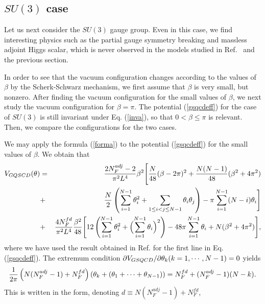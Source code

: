 \documentclass[a4paper,12pt]{article}
\begin{document}
\subsection{$SU(3)$ case}
Let us next consider the $SU(3)$ gauge group. 
Even in this case, we find interesting physics such
as the partial gauge symmetry breaking and massless adjoint 
Higgs scalar, which is never observed in the models 
studied in Ref.~\cite{takenagab} and the previous section. 
\par
In order to see that the vacuum configuration changes
according to the values of $\beta$ by the Scherk-Schwarz 
mechanism, we first assume that $\beta$ is
very small, but nonzero. After finding the vacuum configuration 
for the small values of $\beta$, we next study the vacuum configuration 
for $\beta=\pi$. The potential (\ref{gsqcdeff}) for the case 
of $SU(3)$ is still invariant under Eq. (\ref{inva}), so 
that $0<\beta\leq \pi$ is relevant. Then, we compare 
the configurations for the two cases.
\par
We may apply the formula (\ref{forma}) to the 
potential (\ref{gsqcdeff}) for the small 
values of $\beta$. We obtain that
\begin{eqnarray}
V_{GQSCD}(\theta)&=&
{{2N_F^{adj}-2}\over{\pi^2 L^4}}\beta^2
\Biggl[{N\over{48}}(\beta-2\pi)^2+{{N(N-1)}\over{48}}(\beta^2+4\pi^2
)\nonumber\\
&+&{{N}\over{2}}\left(\sum_{i=1}^{N-1}\theta_i^2+\sum_{1\leq i<j\leq N-1}
\theta_i\theta_j\right)-\pi\sum_{i=1}^{N-1}(N-i)\theta_i\Biggr]\nonumber\\
&+&{{4N_F^{fd}}\over{\pi^2 L^4}}{\beta^2\over {48}}
\Biggl[12\left(\sum_{i=1}^{N-1}\theta_i^2+\Bigl(\sum_{i=1}^{N-1}\theta_i
\Bigr)^2\right)
-48\pi\sum_{i=1}^{N-1}\theta_i+N(\beta^2+4\pi^2)\Biggr],
\label{expand}
\end{eqnarray}
where we have used the result obtained in Ref. \cite{takenagab} for the
first line in Eq. (\ref{gsqcdeff}).
The extremum condition $\partial V_{GSQCD}/\partial\theta_k (k=1, \cdots, N-1)=0$ 
yields
\begin{equation}
{1\over{2\pi}}\left(N(N_F^{adj}-1)+N_F^{fd}\right)
\left(\theta_k+(\theta_1+\cdots +\theta_{N-1})\right)
=N_F^{fd}+(N_F^{adj}-1)(N-k).
\label{gsqcdsol}
\end{equation}
This is written in the form, denoting $d\equiv N(N_F^{adj}-1)+N_F^{fd}$, 
\end{document}
